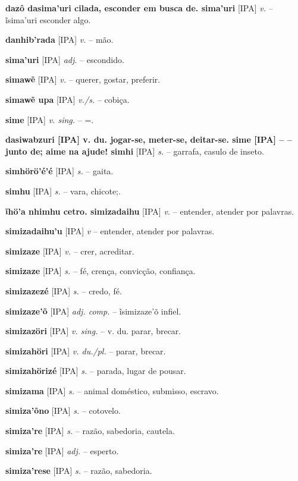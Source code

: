 {\textbf{dazô dasima'uri cilada, esconder em busca de. sima'uri} [IPA] \textit{v.} -- ĩsima'uri esconder algo.

\textbf{danhib'rada} [IPA] \textit{v.} -- mão. \href{https://xavante.pythonanywhere.com/static/dicionario/play.html?file=hand.wav}{\faHeadphones}

\textbf{sima'uri} [IPA] \textit{adj.} -- escondido.

\textbf{simawẽ} [IPA] \textit{v.} -- querer, gostar, preferir. \href{https://xavante.pythonanywhere.com/static/dicionario/play.html?file=want.wav}{\faHeadphones}

\textbf{simawẽ upa} [IPA] \textit{v./s.} -- cobiça.

\textbf{sime} [IPA] \textit{v. sing.} -- =.

\textbf{dasiwabzuri [IPA] v. du. jogar-se, meter-se, deitar-se. sime [IPA]  -- -- junto de; aime na ajude! simhi} [IPA] \textit{s.} -- garrafa, casulo de inseto.

\textbf{simhörö'é'é} [IPA] \textit{s.} -- gaita.

\textbf{simhu} [IPA] \textit{s.} -- vara, chicote;.

\textbf{ĩhö'a nhimhu cetro. simizadaihu} [IPA] \textit{v.} -- entender, atender por palavras.

\textbf{simizadaihu'u} [IPA] \textit{v} -- entender, atender por palavras.

\textbf{simizaze} [IPA] \textit{v.} -- crer, acreditar.

\textbf{simizaze} [IPA] \textit{s.} -- fé, crença, convicção, confiança.

\textbf{simizazezé} [IPA] \textit{s.} -- credo, fé.

\textbf{simizaze'õ} [IPA] \textit{adj. comp.} -- ĩsimizaze'õ infiel.

\textbf{simizazöri} [IPA] \textit{v. sing.} -- v. du. parar, brecar.

\textbf{simizahöri} [IPA] \textit{v. du./pl.} -- parar, brecar.

\textbf{simizahörizé} [IPA] \textit{s.} -- parada, lugar de pousar.

\textbf{simizama} [IPA] \textit{s.} -- animal doméstico, submisso, escravo.

\textbf{simiza'õno} [IPA] \textit{s.} -- cotovelo.

\textbf{simiza're} [IPA] \textit{s.} -- razão, sabedoria, cautela.

\textbf{simiza're} [IPA] \textit{adj.} -- esperto.

\textbf{simiza'rese} [IPA] \textit{s.} -- razão, sabedoria.

}
